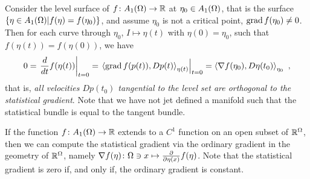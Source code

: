 \documentclass[12pt,a4paper]{amsart}
\begin{document}
\begin{remark} \label{rem:gradient-tangent}
Consider the level surface of $f \colon A_1(\Omega) \to \mathbb R$ at $\eta_0 \in A_1(\Omega)$, that is the surface $\left\{ \eta \in A_1(\Omega) \middle| f(\eta) = f(\eta_0) \right\}$, and assume $\eta_0$ is not a critical point, $\operatorname{grad} f(\eta_0) \ne 0$. Then for each curve through $\eta_0$, $I \mapsto \eta(t)$ with $\eta(0) = \eta_0$, such that $f(\eta(t)) = f(\eta(0))$, we have
%
\begin{equation*}
  0 = \left. \derivby t f(\eta(t)) \right|_{t=0} = \left. \scalarat {\eta(t)} {\grad f(p(t))} {Dp(t)} \right|_{t=0} = \scalarat {\eta_0} {\nabla f(\eta_0)} {D\eta(t_0)} \ ,
\end{equation*}
%
that is, \emph{all velocities $Dp(t_0)$ tangential to the level set are orthogonal to the statistical gradient}. Note that we have not jet defined a manifold such that the statistical bundle is equal to the tangent bundle. 
\end{remark}

\begin{remark}
If the function $f \colon A_1(\Omega) \to \mathbb R$ extends to a $C^1$ function on an open subset of $\mathbb R^\Omega$, then we can compute the statistical gradient via the ordinary gradient in the geometry of $\mathbb R^\Omega$, namely $\nabla f(\eta) \colon \Omega \ni x \mapsto \frac{\partial}{\partial \eta(x)} f(\eta)$.  Note that the statistical gradient is zero if, and only if, the ordinary gradient is constant.
\end{remark}
\end{document}
